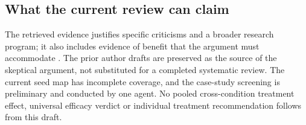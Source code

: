 \subsection{What the current review can claim}
The retrieved evidence justifies specific criticisms and a broader research program; it also includes evidence of benefit that the argument must accommodate \citep{Carpenter2018,Cuijpers2023,Cuijpers2025}.
The prior author drafts are preserved as the source of the skeptical argument, not substituted for a completed systematic review.
The current seed map has incomplete coverage, and the case-study screening is preliminary and conducted by one agent.
No pooled cross-condition treatment effect, universal efficacy verdict or individual treatment recommendation follows from this draft.

